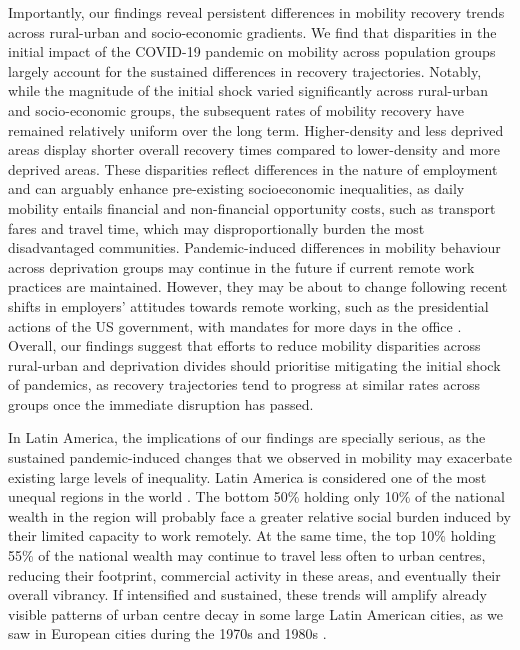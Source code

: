 \documentclass[fleqn,10pt]{wlscirep}
\begin{document}
Importantly, our findings reveal persistent differences in mobility recovery trends across rural-urban and socio-economic gradients. We find that disparities in the initial impact of the COVID-19 pandemic on mobility across population groups largely account for the sustained differences in recovery trajectories. Notably, while the magnitude of the initial shock varied significantly across rural-urban and socio-economic groups, the subsequent rates of mobility recovery have remained relatively uniform over the long term. Higher-density and less deprived areas display shorter overall recovery times compared to lower-density and more deprived areas. These disparities reflect differences in the nature of employment \cite{ILO21} and can arguably enhance pre-existing socioeconomic inequalities, as daily mobility entails financial and non-financial opportunity costs, such as transport fares and travel time, which may disproportionally burden the most disadvantaged communities. Pandemic-induced differences in mobility behaviour across deprivation groups may continue in the future if current remote work practices are maintained. However, they may be about to change following recent shifts in employers' attitudes towards remote working, such as the presidential actions of the US government, with mandates for more days in the office \cite{WhiteHouse2025Return, CIPD2025LMO}. Overall, our findings suggest that efforts to reduce mobility disparities across rural-urban and deprivation divides should prioritise mitigating the initial shock of pandemics, as recovery trajectories tend to progress at similar rates across groups once the immediate disruption has passed.

In Latin America, the implications of our findings are specially serious, as the sustained pandemic-induced changes that we observed in mobility may exacerbate existing large levels of inequality. Latin America is considered one of the most unequal regions in the world \cite{WIReport22}. The bottom 50\% holding only 10\% of the national wealth in the region will probably face a greater relative social burden induced by their limited capacity to work remotely. At the same time, the top 10\% holding 55\% of the national wealth may continue to travel less often to urban centres, reducing their footprint, commercial activity in these areas, and eventually their overall vibrancy. If intensified and sustained, these trends will amplify already visible patterns of urban centre decay in some large Latin American cities, as we saw in European cities during the 1970s and 1980s \cite{THORSTEN}.
\end{document}
